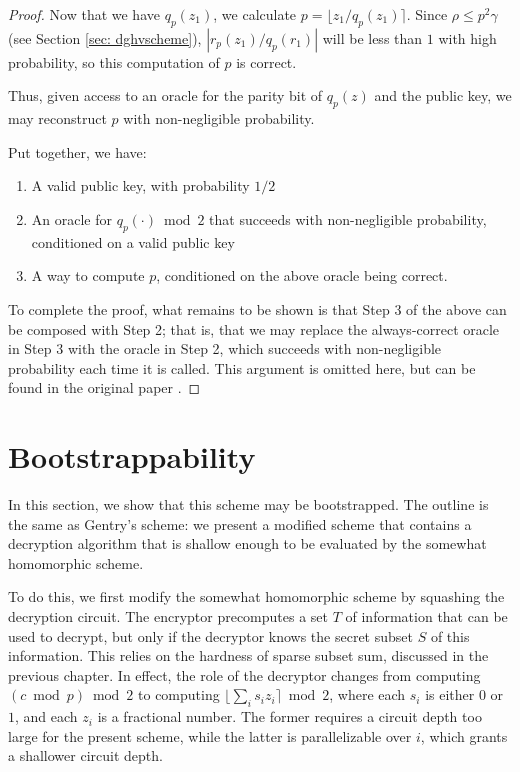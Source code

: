 \begin{proof}
Now that we have $q_p(z_1)$, we calculate $p = \lfloor z_1 / q_p(z_1) \rceil$. Since $\rho \leq p^2 \gamma$ (see Section \ref{sec: dghvscheme}), $|r_p(z_1) / q_p(r_1)|$ will be less than $1$ with high probability, so this computation of $p$ is correct.

Thus, given access to an oracle for the parity bit of $q_p(z)$ and the public key, we may reconstruct $p$ with non-negligible probability.

Put together, we have:
\begin{enumerate}
    \item A valid public key, with probability $1/2$
    \item An oracle for $q_p(\cdot) \bmod 2$ that succeeds with non-negligible probability, conditioned on a valid public key
    \item A way to compute $p$, conditioned on the above oracle being correct.
\end{enumerate}

To complete the proof, what remains to be shown is that Step 3 of the above can be composed with Step 2; that is, that we may replace the always-correct oracle in Step 3 with the oracle in Step 2, which succeeds with non-negligible probability each time it is called. This argument is omitted here, but can be found in the original paper \cite{dghv}.

\end{proof}


\section{Bootstrappability} \label{sec: dghvsquashed}
In this section, we show that this scheme may be bootstrapped. The outline is the same as Gentry's scheme: we present a modified scheme that contains a decryption algorithm that is shallow enough to be evaluated by the somewhat homomorphic scheme.

To do this, we first modify the somewhat homomorphic scheme by squashing the decryption circuit. The encryptor precomputes a set $T$ of information that can be used to decrypt, but only if the decryptor knows the secret subset $S$ of this information. This relies on the hardness of sparse subset sum, discussed in the previous chapter. In effect, the role of the decryptor changes from computing $(c \bmod p) \bmod 2$ to computing $\lfloor \sum_i s_i z_i \rceil \bmod 2$, where each $s_i$ is either $0$ or $1$, and each $z_i$ is a fractional number. The former requires a circuit depth too large for the present scheme, while the latter is parallelizable over $i$, which grants a shallower circuit depth.

